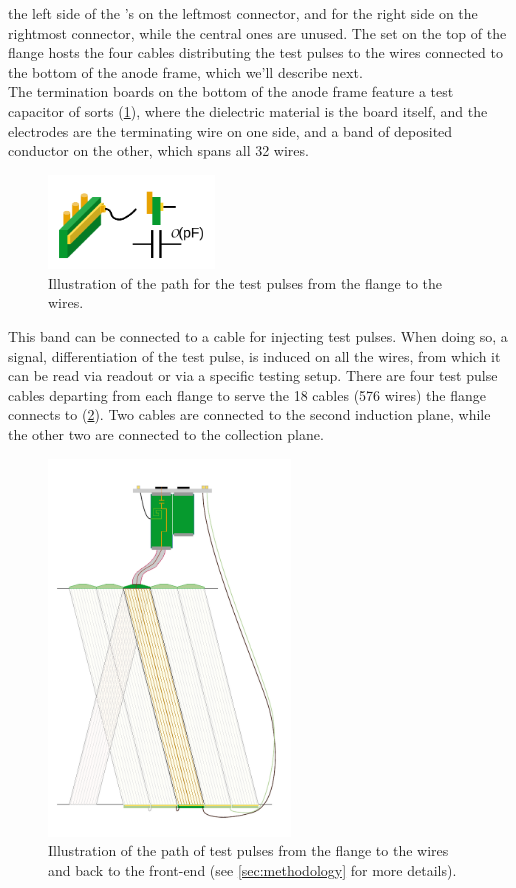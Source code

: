 the left side of the \DBB's on the leftmost connector, and for the right side on
the rightmost connector, while the central ones are unused.
The set on the top of the flange hosts the four cables distributing the test
pulses to the wires connected to the bottom of the anode frame, which we'll
describe next.
\\
The termination boards on the bottom of the anode frame feature a test capacitor
of sorts (\cref{fig:TestCapacitance}), where the dielectric material is
the board itself, and the electrodes are the terminating wire on one side, and a
band of deposited conductor on the other, which spans all 32 wires.
\begin{figure}
  \center
  \includegraphics[height=2.5cm]{fig/TerminatorCapacitance}
  \caption{\label{fig:TestCapacitance}
    Illustration of the path for the test pulses from the flange to the wires.
  }
\end{figure}
This band can be connected to a cable for injecting test pulses.
When doing so, a signal, differentiation of the test pulse, is induced on all
the wires, from which it can be read via readout or via a specific testing
setup.
There are four test pulse cables departing from each flange to serve the 18
cables (576 wires) the flange connects to (\cref{fig:PulseCables}).
Two cables are connected to the second induction plane, while the other two are
connected to the collection plane.
\begin{figure}
  \center
  \includegraphics[height=10cm]{fig/PulseCablePath}
  \caption{\label{fig:PulseCables}
    Illustration of the path of test pulses from the flange to the wires and
    back to the front-end
    (see \cref{sec:methodology} for more details).
  }
\end{figure}
